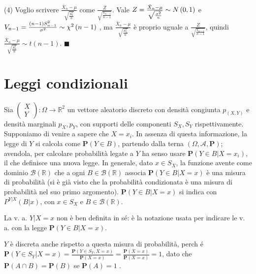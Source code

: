 \documentclass{article}
\begin{document}
(4) Voglio scrivere $\frac{\bar{X}_{n}-\mu }{\sqrt{\frac{S_{n}^{2}}{n}}}$
come $\frac{Z}{\sqrt{\frac{V_{n-1}}{n-1}}}$. Vale $Z=\frac{\bar{X}_{n}-\mu }{%
\sqrt{\frac{\sigma ^{2}}{n}}}\sim N\left( 0,1\right) $ e $V_{n-1}=\frac{%
\left( n-1\right) S_{n-1}^{2}}{\sigma ^{2}}\sim \chi ^{2}\left( n-1\right) $%
, ma $\frac{\bar{X}_{n}-\mu }{\sqrt{\frac{S_{n}^{2}}{n}}}$ \`{e} proprio
uguale a $\frac{Z}{\sqrt{\frac{V_{n-1}}{n-1}}}$, quindi $\frac{\bar{X}%
_{n}-\mu }{\sqrt{\frac{S_{n}^{2}}{n}}}\sim t\left( n-1\right) $. $%
\blacksquare $

\section{Leggi condizionali}

Sia $\left( 
\begin{array}{c}
X \\ 
Y%
\end{array}%
\right) :\Omega \rightarrow 
\mathbb{R}
^{2}$ un vettore aleatorio discreto con densit\`{a} congiunta $p_{\left(
X,Y\right) }$ e densit\`{a} marginali $p_{X},p_{Y}$, con supporti delle
componenti $S_{X},S_{Y}$ rispettivamente. Supponiamo di venire a sapere che $%
X=x_{i}$. In assenza di questa informazione, la legge di $Y$ si calcola come 
$\mathbf{P}\left( Y\in B\right) $, partendo dalla terna $\left( \Omega ,%
\mathcal{A},\mathbf{P}\right) $; avendola, per calcolare probabilit\`{a}
legate a $Y$ ha senso usare $\mathbf{P}\left( Y\in B|X=x_{i}\right) $, il
che definisce una nuova legge. In generale, dato $x\in S_{X}$, la funzione
avente come dominio $\mathcal{B}\left( 
\mathbb{R}
\right) $ che a ogni $B\in \mathcal{B}\left( 
\mathbb{R}
\right) $ associa $\mathbf{P}\left( Y\in B|X=x\right) $ \`{e} una misura di
probabilit\`{a} (si \`{e} gi\`{a} visto che la probabilit\`{a} condizionata 
\`{e} una misura di probabilit\`{a} nel suo primo argomento). $\mathbf{P}%
\left( Y\in B|X=x\right) $ si indica con $P^{Y|X}\left( B|x\right) $, con $%
x\in S_{X}$ e $B\in \mathcal{B}\left( 
\mathbb{R}
\right) $.

La v. a. $Y|X=x$ non \`{e} ben definita in s\'{e}: \`{e} la notazione usata
per indicare le v. a. con la legge $\mathbf{P}\left( Y\in B|X=x\right) $.

$Y$ \`{e} discreta anche rispetto a questa misura di probabilit\`{a}, perch%
\'{e} $\mathbf{P}\left( Y\in S_{Y}|X=x\right) =\frac{\mathbf{P}\left( Y\in
S_{Y},X=x\right) }{\mathbf{P}\left( X=x\right) }=\frac{\mathbf{P}\left(
X=x\right) }{\mathbf{P}\left( X=x\right) }=1$, dato che $\mathbf{P}\left(
A\cap B\right) =\mathbf{P}\left( B\right) $ se $\mathbf{P}\left( A\right) =1$%
.
\end{document}
